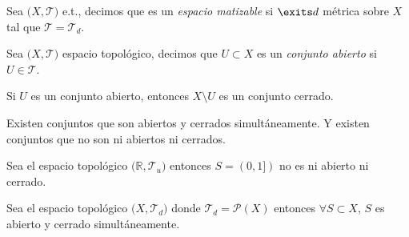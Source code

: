 \begin{defn}
  Sea $\big( X, \mathcal{T} \big)$ e.t., decimos que es un \textit{espacio matizable} si $\exits d$ métrica sobre $X$ tal que $\mathcal{T} = \mathcal{T}_{d}$.
\end{defn}

\begin{defn}
  Sea $\big( X, \mathcal{T} \big)$ espacio topológico, decimos que $U \subset X$ es un \textit{conjunto abierto} si $U \in \mathcal{T}$.
\end{defn}

\begin{obs}
  Si $U$ es un conjunto abierto, entonces $X \setminus U$ es un conjunto cerrado.
\end{obs}

\begin{obs}
  Existen conjuntos que son abiertos y cerrados simultáneamente. Y existen conjuntos que no son ni abiertos ni cerrados.
\end{obs}

\begin{ejm}
  Sea el espacio topológico $\big( \mathbb{R}, \mathcal{T}_{u} \big)$ entonces $S = (0,1])$ no es ni abierto ni cerrado.
\end{ejm}

\begin{ejm}
  Sea el espacio topológico $\big( X, \mathcal{T}_{d} \big)$ donde $\mathcal{T}_{d}=\mathcal{P}(X)$ entonces $\forall S \subset X$, $S$ es abierto y cerrado simultáneamente.
\end{ejm}
